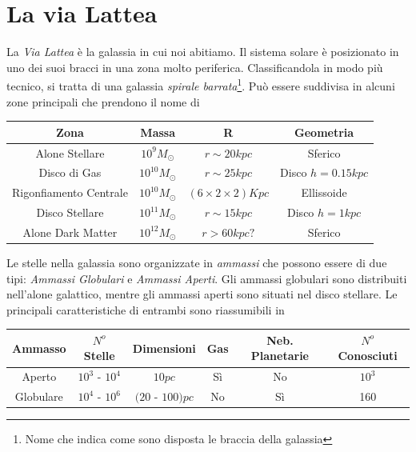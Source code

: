 \chapter{La via Lattea}
La \emph{Via Lattea} \`e la galassia in cui noi abitiamo. Il sistema solare \`e posizionato in uno dei suoi bracci in una zona molto periferica. Classificandola in modo pi\`u tecnico, si tratta di una galassia \emph{spirale barrata}\footnote{Nome che indica come sono disposta le braccia della galassia}. Pu\`o essere suddivisa in alcuni zone principali che prendono il nome di
\begin{center}
\begin{tabular}{c c c c}
	\hline
	\hline
	Zona & Massa & R & Geometria \\
	\hline
	\hline
	Alone Stellare & $10^9M_{\odot}$ & $r\sim20kpc$ & Sferico\\
	Disco di Gas   & $10^{10}M_{\odot}$ & $r\sim25kpc$ & Disco $h=0.15kpc$\\
	Rigonfiamento Centrale & $10^{10}M_{\odot}$ & $(6\times2\times2)Kpc$ & Ellissoide\\
	Disco Stellare & $10^{11}M_{\odot}$ & $r\sim15kpc$ & Disco $h=1kpc$\\
	Alone Dark Matter & $10^{12}M_{\odot}$ & $r>60kpc?$ & Sferico\\
	\hline
\end{tabular}
\end{center}
Le stelle nella galassia sono organizzate in \emph{ammassi} che possono essere di due tipi: \emph{Ammassi Globulari} e \emph{Ammassi Aperti}. Gli ammassi globulari sono distribuiti nell'alone galattico, mentre gli ammassi aperti sono situati nel disco stellare. Le principali caratteristiche di entrambi sono riassumibili in
\begin{center}
\begin{tabular}{c c c c c c}
	\hline
	\hline
	Ammasso & $N^o$ Stelle & Dimensioni & Gas & Neb. Planetarie & $N^o$ Conosciuti \\
	\hline
	\hline
	Aperto & $10^3$ - $10^4$ & $10pc$ & S\`i & No & $10^3$\\
	Globulare & $10^4$ - $10^6$ & $(20$ - $100)pc$ & No & S\`i & 160\\
	\hline
\end{tabular}
\end{center}
